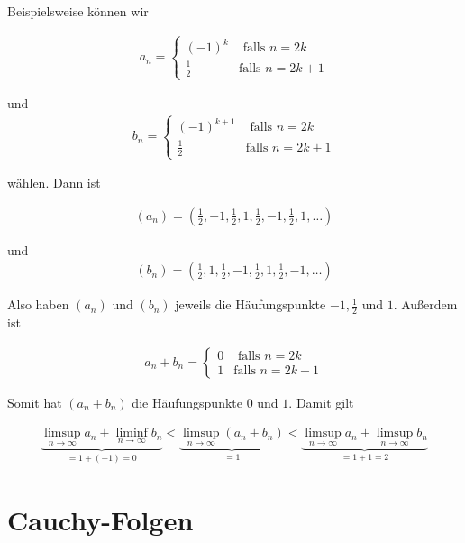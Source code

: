 \documentclass[fontsize=9pt,
               parskip=half-,
               DIV=14,
               listof=chapterentry,
               tocflat]{scrbook}
\begin{document}
\begin{proof*}
Beispielsweise können wir

\begin{align*}
a_{n}={\begin{cases}(-1)^{k}&{\text{ falls }}n=2k\\{\frac {1}{2}}&{\text{falls }}n=2k+1\end{cases}}
\end{align*}

 und \begin{align*}
b_{n}={\begin{cases}(-1)^{k+1}&{\text{ falls }}n=2k\\{\frac {1}{2}}&{\text{falls }}n=2k+1\end{cases}}
\end{align*}

wählen. Dann ist

\begin{align*}
(a_{n})=({\tfrac {1}{2}},-1,{\tfrac {1}{2}},1,{\tfrac {1}{2}},-1,{\tfrac {1}{2}},1,\ldots )
\end{align*}

 und \begin{align*}
(b_{n})=({\tfrac {1}{2}},1,{\tfrac {1}{2}},-1,{\tfrac {1}{2}},1,{\tfrac {1}{2}},-1,\ldots )
\end{align*}

Also haben $(a_{n})$ und $(b_{n})$ jeweils die Häufungspunkte $-1,{\tfrac {1}{2}}$ und $1$. Außerdem ist

\begin{align*}
a_{n}+b_{n}={\begin{cases}0&{\text{ falls }}n=2k\\1&{\text{falls }}n=2k+1\end{cases}}
\end{align*}

Somit hat $(a_{n}+b_{n})$ die Häufungspunkte $0$ und $1$. Damit gilt

\begin{align*}
\underbrace {\limsup _{n\to \infty }a_{n}+\liminf _{n\to \infty }b_{n}} _{=1+(-1)=0}<\underbrace {\limsup _{n\to \infty }(a_{n}+b_{n})} _{=1}<\underbrace {\limsup _{n\to \infty }a_{n}+\limsup _{n\to \infty }b_{n}} _{=1+1=2}
\end{align*}

\end{proof*}

\chapter{Cauchy-Folgen}
\end{document}
